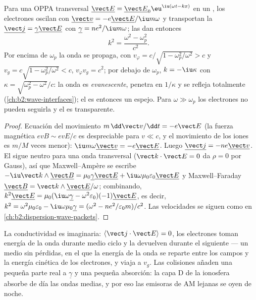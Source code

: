 \begin{theorem}\label{thm:b2:waves-in-media:plasmadispersion}
Para una OPPA transversal $\underline{\vect E} = \underline{\vect E}_0\eu^{\iu(\omega t - kx)}$ en
un , los electrones oscilan con $\underline{\vect v} = -e\underline{\vect E}/\iu m\omega$
y transportan la  $\underline{\vect j} = \underline\gamma\underline{\vect E}$ con
$\underline\gamma = ne^2/\iu m\omega$; las  dan entonces
\[
k^2 = \frac{\omega^2 - \omega_p^2}{c^2} .
\]
Por encima de $\omega_p$ la onda se propaga, con $v_\varphi = c/\sqrt{1 - \omega_p^2/\omega^2}
> c$ y $v_g = c\sqrt{1 - \omega_p^2/\omega^2} < c$, $v_\varphi v_g = c^2$; por debajo
de $\omega_p$, $k = -\iu\kappa$ con $\kappa = \sqrt{\omega_p^2 - \omega^2}/c$: la onda es
\emph{evanescente}, penetra en $1/\kappa$ y se refleja totalmente
(\cref{ch:b2:wave-interfaces}); el  es entonces un espejo. Para $\omega
\gg \omega_p$ los electrones no pueden seguirla y el  es transparente.
\end{theorem}

\begin{proof}
Ecuación del movimiento $m\,\dd\vect v/\dd t = -e\vect E$ (la fuerza magnética
$ev B \sim evE/c$ es despreciable para $v \ll c$, y el movimiento de los iones es
$m/M$ veces menor): $\iu m\omega\underline{\vect v} = -e\underline{\vect E}$. Luego
$\underline{\vect j} = -ne\underline{\vect v}$. El  sigue neutro para una onda
transversal ($\vect k\cdot\vect E = 0$ da $\rho = 0$ por Gauss), así que
Maxwell--Ampère se escribe $-\iu\vect k\wedge\underline{\vect B} = \mu_0\underline\gamma\underline{\vect E}
+ \iu\omega\mu_0\varepsilon_0\underline{\vect E}$ y Maxwell--Faraday $\underline{\vect B} = \vect k
\wedge\underline{\vect E}/\omega$; combinando, $k^2\underline{\vect E} = \mu_0(\iu\omega\underline\gamma -
\omega^2\varepsilon_0)(-1)\underline{\vect E}$, es decir, $k^2 = \omega^2\mu_0\varepsilon_0 - \iu\omega\mu_0
\underline\gamma = (\omega^2 - ne^2/\varepsilon_0m)/c^2$. Las velocidades se siguen como en
\cref{ch:b2:dispersion-wave-packets}.
\end{proof}

\begin{remark}\label{rem:b2:waves-in-media:plasmaenergy}
La conductividad es imaginaria: $\langle\vect j\cdot\vect E\rangle = 0$, los
electrones toman energía de la onda durante medio ciclo y la devuelven
durante el siguiente --- un medio sin pérdidas, en el que la energía de la
onda se reparte entre los campos y la energía cinética de los electrones,
y viaja a $v_g$. Las colisiones añaden una pequeña parte real a $\underline\gamma$ y
una pequeña absorción: la capa D de la ionosfera absorbe de día las ondas
medias, y por eso las emisoras de AM lejanas se oyen de noche.
\end{remark}

